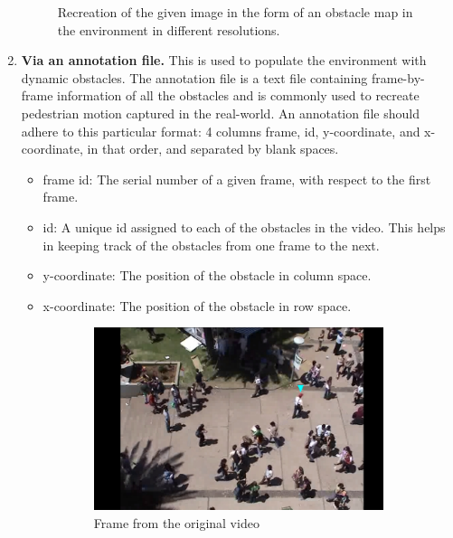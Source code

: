 \begin{enumerate}
\begin{figure}[!h]
	\caption{Recreation of the given image in the form of an obstacle map in the environment in different resolutions.}
	\label{fig:fig}
\end{figure}
\item \textbf{Via an annotation file.}
This is used to populate the environment with dynamic obstacles. The annotation file is a text file containing frame-by-frame information of all the obstacles and is commonly used to recreate pedestrian motion captured in the real-world. An annotation file should adhere to this particular format: 4 columns frame, id, y-coordinate, and x-coordinate, in that order, and separated by blank spaces.
\begin{itemize}
    \item frame id: The serial number of a given frame, with respect to the first frame.
    \item id: A unique id assigned to each of the obstacles in the video. This helps in keeping track of the obstacles from one frame to the next.
    \item y-coordinate: The position of the obstacle in column space.
    \item x-coordinate: The position of the obstacle in row space.
\end{itemize}
\begin{figure}[htbp]
	\begin{subfigure}{0.5\textwidth}
		\centering
		\includegraphics[width=.95\linewidth]{figures/video_frame_students_with_agent_pointer.png}
		\caption{Frame from the original video}
		\label{fig:anno_sfig1}
	\end{subfigure}
	\begin{subfigure}{0.5\textwidth}
		\centering

\end{subfigure}
\end{figure}
\end{enumerate}
